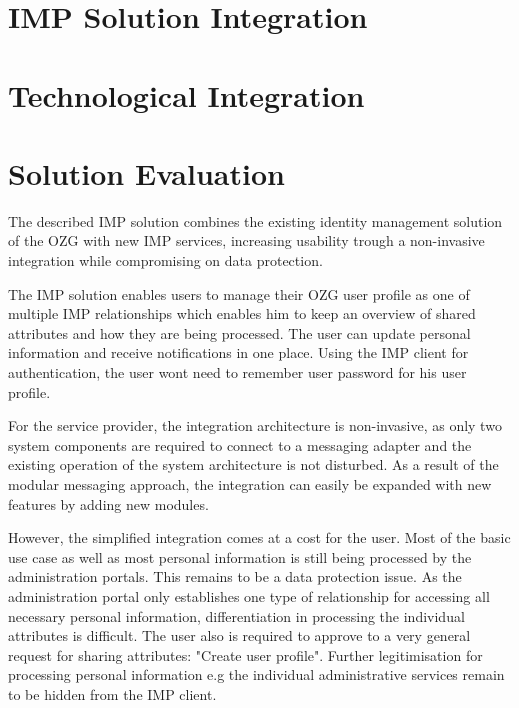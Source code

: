\section{IMP Solution Integration}



\section{Technological Integration}



\section{Solution Evaluation}

The described IMP solution combines the existing identity management solution of the OZG with new IMP services, increasing usability trough a non-invasive integration while compromising on data protection.

The IMP solution enables users to manage their OZG user profile as one of multiple IMP relationships which enables him to keep an overview of shared attributes and how they are being processed. The user can update personal information and receive notifications in one place. Using the IMP client for authentication, the user wont need to remember user password for his user profile.

For the service provider, the integration architecture is non-invasive, as only two system components are required to connect to a messaging adapter and the existing operation of the system architecture is not disturbed. As a result of the modular messaging approach, the integration can easily be expanded with new features by adding new modules.

However, the simplified integration comes at a cost for the user. Most of the basic use case as well as most personal information is still being processed by the administration portals. This remains to be a data protection issue. As the administration portal only establishes one type of relationship for accessing all necessary personal information, differentiation in processing the individual attributes is difficult. The user also is required to approve to a very general request for sharing attributes: "Create user profile". Further legitimisation for processing personal information e.g the individual administrative services remain to be hidden from the IMP client.

